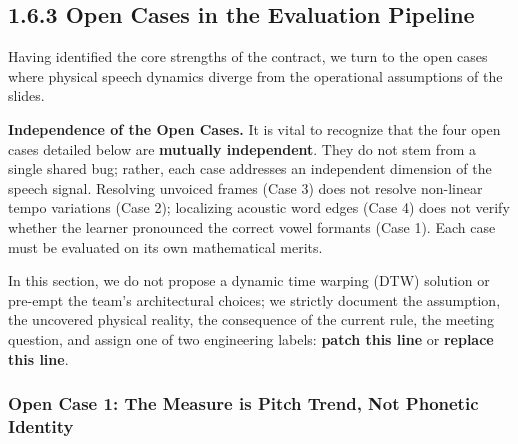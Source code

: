 \documentclass[11pt,a4paper]{article}
\begin{document}
\subsection*{1.6.3 Open Cases in the Evaluation Pipeline}

Having identified the core strengths of the contract, we turn to the open cases where physical speech dynamics diverge from the operational assumptions of the slides. 

\textbf{Independence of the Open Cases.} It is vital to recognize that the four open cases detailed below are \textbf{mutually independent}. They do not stem from a single shared bug; rather, each case addresses an independent dimension of the speech signal. Resolving unvoiced frames (Case 3) does not resolve non-linear tempo variations (Case 2); localizing acoustic word edges (Case 4) does not verify whether the learner pronounced the correct vowel formants (Case 1). Each case must be evaluated on its own mathematical merits. 

In this section, we do not propose a dynamic time warping (DTW) solution or pre-empt the team's architectural choices; we strictly document the assumption, the uncovered physical reality, the consequence of the current rule, the meeting question, and assign one of two engineering labels: \textbf{patch this line} or \textbf{replace this line}.

\subsubsection*{Open Case 1: The Measure is Pitch Trend, Not Phonetic Identity}
\end{document}
